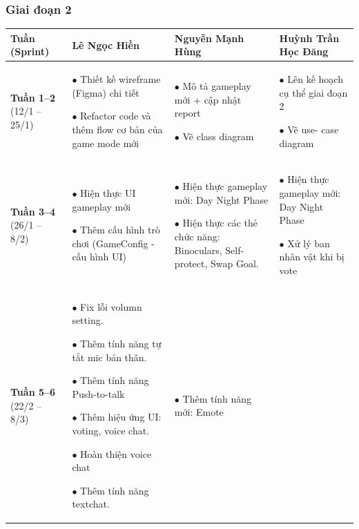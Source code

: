 \subsubsection{Giai đoạn 2}
\begin{longtable}{|p{2cm}|p{4cm}|p{4cm}|p{4cm}|}
\hline
\textbf{Tuần (Sprint)} & \textbf{Lê Ngọc Hiền} & \textbf{Nguyễn Mạnh Hùng} & \textbf{Huỳnh Trần Học Đăng} \\
\hline

\textbf{Tuần 1--2} \newline (12/1 -- 25/1)
&
    $\bullet$ Thiết kế wireframe (Figma) chi tiết
    
    $\bullet$ Refactor code và thêm flow cơ bản của game mode mới
    
&
    $\bullet$ Mô tả gameplay mới + cập nhật report
    
    $\bullet$ Vẽ class diagram 
    
&
    $\bullet$ Lên kế hoạch cụ thể giai đoạn 2
    
    $\bullet$ Vẽ use- case diagram 
    
\\
\hline

\textbf{Tuần 3--4} \newline (26/1 -- 8/2)
&
    $\bullet$ Hiện thực UI gameplay mới
    
    $\bullet$ Thêm cấu hình trò chơi (GameConfig - cấu hình UI)
    
&
    $\bullet$ Hiện thực gameplay mới: Day Night Phase
    
    $\bullet$ Hiện thực các thẻ chức năng: Binoculars, Self-protect, Swap Goal.

&
    $\bullet$ Hiện thực gameplay mới: Day Night Phase
    
    $\bullet$ Xử lý ban nhân vật khi bị vote
    
\\
\hline

\textbf{Tuần 5--6} \newline (22/2 -- 8/3)
&
    $\bullet$ Fix lỗi volumn setting.
    
    $\bullet$ Thêm tính năng tự tắt mic bản thân.
    
    $\bullet$ Thêm tính năng Push-to-talk

    $\bullet$ Thêm hiệu ứng UI: voting, voice chat.

    $\bullet$ Hoàn thiện voice chat

    $\bullet$ Thêm tính năng textchat.
&
    $\bullet$ Thêm tính năng mới: Emote
    

\end{longtable}
